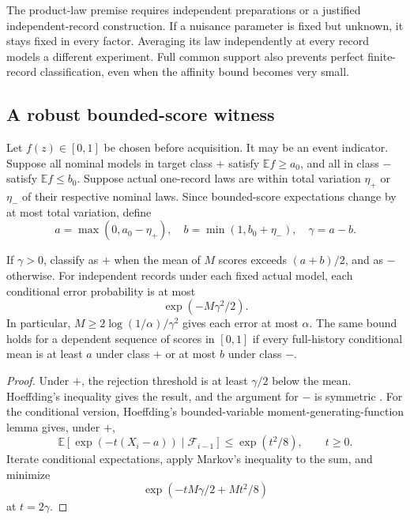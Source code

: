 The product-law premise requires independent preparations or a justified
independent-record construction. If a nuisance parameter is fixed but unknown,
it stays fixed in every factor. Averaging its law independently at every record
models a different experiment. Full common support also prevents perfect
finite-record classification, even when the affinity bound becomes very small.

\subsection{A robust bounded-score witness}

Let $f(z)\in[0,1]$ be chosen before acquisition. It may be an event indicator.
Suppose all nominal models in target class $+$ satisfy
$\mathbb E f\geq a_0$, and all in class $-$ satisfy $\mathbb E f\leq b_0$.
Suppose actual one-record laws are within total variation $\eta_+$ or $\eta_-$
of their respective nominal laws. Since bounded-score expectations change by
at most total variation, define
\begin{equation}
 a=\max(0,a_0-\eta_+),\quad
 b=\min(1,b_0+\eta_-),\quad \gamma=a-b.
 \label{precision:robust-gap}
\end{equation}

\begin{proposition}
\label{precision:score-test}
If $\gamma>0$, classify as $+$ when the mean of $M$ scores exceeds
$(a+b)/2$, and as $-$ otherwise. For independent records under each fixed
actual model, each conditional error probability is at most
\[
 \exp(-M\gamma^2/2).
\]
In particular, $M\geq2\log(1/\alpha)/\gamma^2$ gives each error at most
$\alpha$. The same bound holds for a dependent sequence of scores in $[0,1]$
if every full-history conditional mean is at least $a$ under class $+$ or at
most $b$ under class $-$.
\end{proposition}
\begin{proof}
Under $+$, the rejection threshold is at least $\gamma/2$ below the mean.
Hoeffding's inequality gives the result, and the argument for $-$ is symmetric
\cite{caHoeffding1963}. For the conditional version, Hoeffding's bounded-variable
moment-generating-function lemma gives, under $+$,
\[
 \mathbb E[\exp(-t(X_i-a))\mid\mathcal F_{i-1}]
 \leq\exp(t^2/8),\qquad t\geq0.
\]
Iterate conditional expectations, apply Markov's inequality to the sum, and
minimize
\[
 \exp(-tM\gamma/2+Mt^2/8)
\]
at $t=2\gamma$.
\end{proof}

